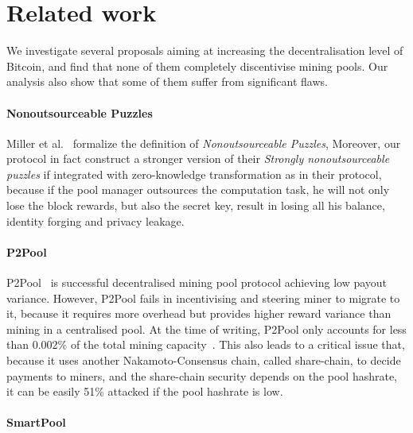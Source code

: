 \section{Related work}

We investigate several proposals aiming at increasing the decentralisation level of Bitcoin, and find that none of them completely discentivise mining pools.
Our analysis also show that some of them suffer from significant flaws.

\paragraph{\textbf{Nonoutsourceable Puzzles}}
Miller et al.~\cite{miller2015nonoutsourceable} formalize the definition of \textit{Nonoutsourceable Puzzles},
Moreover, our protocol in fact construct a stronger version of their \textit{Strongly nonoutsourceable puzzles} if integrated with zero-knowledge transformation as in their protocol, because if the pool manager outsources the computation task, he will not only lose the block rewards, but also the secret key, result in losing all his balance, identity forging and privacy leakage.

\paragraph{\textbf{P2Pool}}
P2Pool~\cite{p2pool} is successful decentralised mining pool protocol achieving low payout variance.
However, P2Pool fails in incentivising and steering miner to migrate to it, because it requires more overhead but provides higher reward variance than mining in a centralised pool.
At the time of writing, P2Pool only accounts for less than 0.002\% of the total mining capacity~\cite{p2pool-stats}.
This also leads to a critical issue that, because it uses another Nakamoto-Consensus chain, called share-chain, to decide payments to miners, and the share-chain security depends on the pool hashrate, it can be easily 51\% attacked if the pool hashrate is low.


\paragraph{\textbf{SmartPool}}

